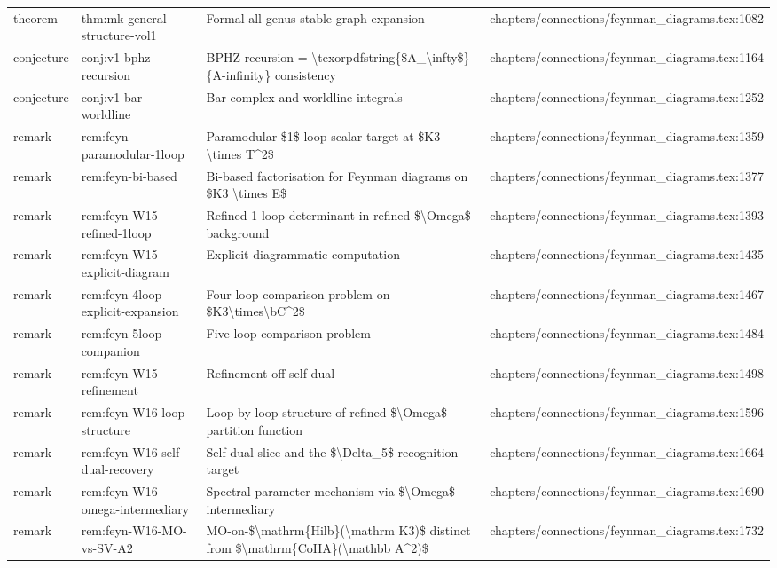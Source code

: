\documentclass[11pt]{article}
\begin{document}
\begin{longtable}{L{0.10\textwidth}L{0.26\textwidth}L{0.42\textwidth}L{0.22\textwidth}}
theorem & thm:mk-general-structure-vol1 & Formal all-genus stable-graph expansion & chapters/connections/feynman\_diagrams.tex:1082\\
conjecture & conj:v1-bphz-recursion & BPHZ recursion = \textbackslash{}texorpdfstring\{\$A\_\textbackslash{}infty\$\}\{A-infinity\} consistency & chapters/connections/feynman\_diagrams.tex:1164\\
conjecture & conj:v1-bar-worldline & Bar complex and worldline integrals & chapters/connections/feynman\_diagrams.tex:1252\\
remark & rem:feyn-paramodular-1loop & Paramodular \$1\$-loop scalar target at \$K3 \textbackslash{}times T\textasciicircum{}2\$ & chapters/connections/feynman\_diagrams.tex:1359\\
remark & rem:feyn-bi-based & Bi-based factorisation for Feynman diagrams on \$K3 \textbackslash{}times E\$ & chapters/connections/feynman\_diagrams.tex:1377\\
remark & rem:feyn-W15-refined-1loop & Refined 1-loop determinant in refined \$\textbackslash{}Omega\$-background & chapters/connections/feynman\_diagrams.tex:1393\\
remark & rem:feyn-W15-explicit-diagram & Explicit diagrammatic computation & chapters/connections/feynman\_diagrams.tex:1435\\
remark & rem:feyn-4loop-explicit-expansion & Four-loop comparison problem on \$K3\textbackslash{}times\textbackslash{}bC\textasciicircum{}2\$ & chapters/connections/feynman\_diagrams.tex:1467\\
remark & rem:feyn-5loop-companion & Five-loop comparison problem & chapters/connections/feynman\_diagrams.tex:1484\\
remark & rem:feyn-W15-refinement & Refinement off self-dual & chapters/connections/feynman\_diagrams.tex:1498\\
remark & rem:feyn-W16-loop-structure & Loop-by-loop structure of refined \$\textbackslash{}Omega\$-partition function & chapters/connections/feynman\_diagrams.tex:1596\\
remark & rem:feyn-W16-self-dual-recovery & Self-dual slice and the \$\textbackslash{}Delta\_5\$ recognition target & chapters/connections/feynman\_diagrams.tex:1664\\
remark & rem:feyn-W16-omega-intermediary & Spectral-parameter mechanism via \$\textbackslash{}Omega\$-intermediary & chapters/connections/feynman\_diagrams.tex:1690\\
remark & rem:feyn-W16-MO-vs-SV-A2 & MO-on-\$\textbackslash{}mathrm\{Hilb\}(\textbackslash{}mathrm K3)\$ distinct from \$\textbackslash{}mathrm\{CoHA\}(\textbackslash{}mathbb A\textasciicircum{}2)\$ & chapters/connections/feynman\_diagrams.tex:1732\\

\end{longtable}
\end{document}

